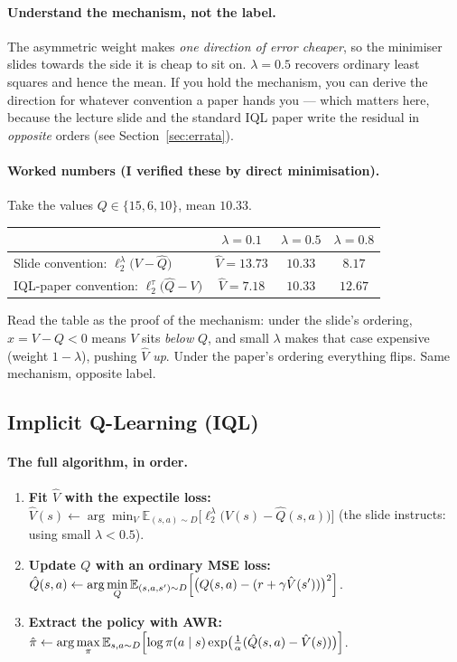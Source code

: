 \documentclass[11pt,a4paper]{article}
\begin{document}
\paragraph{Understand the mechanism, not the label.} The asymmetric weight
makes \emph{one direction of error cheaper}, so the minimiser slides towards
the side it is cheap to sit on. $\lambda=0.5$ recovers ordinary least squares
and hence the mean. If you hold the mechanism, you can derive the direction
for whatever convention a paper hands you --- which matters here, because the
lecture slide and the standard IQL paper write the residual in
\emph{opposite} orders (see Section~\ref{sec:errata}).

\paragraph{Worked numbers (I verified these by direct minimisation).} Take the
values $Q\in\{15,6,10\}$, mean $10.33$.
\begin{center}
\begin{tabular}{@{}lccc@{}}
\toprule
& $\lambda=0.1$ & $\lambda=0.5$ & $\lambda=0.8$ \\
\midrule
Slide convention: $\ell_2^\lambda\bigl(V-\hat Q\bigr)$ & $\hat V=13.73$ & $10.33$ & $8.17$ \\
IQL-paper convention: $\ell_2^{\tau}\bigl(\hat Q-V\bigr)$ & $\hat V=7.18$ & $10.33$ & $12.67$ \\
\bottomrule
\end{tabular}
\end{center}
Read the table as the proof of the mechanism: under the slide's ordering,
$x=V-Q<0$ means $V$ sits \emph{below} $Q$, and small $\lambda$ makes that case
expensive (weight $1-\lambda$), pushing $\hat V$ \emph{up}. Under the paper's
ordering everything flips. Same mechanism, opposite label.

\subsection{Implicit Q-Learning (IQL)}

\paragraph{The full algorithm, in order.}
\begin{enumerate}[label=\arabic*.]
\item \textbf{Fit $\hat V$ with the expectile loss:}
$\displaystyle \hat V(s)\leftarrow\arg\min_V \mathbb E_{(s,a)\sim D}\bigl[\ell_2^{\lambda}\bigl(V(s)-\hat Q(s,a)\bigr)\bigr]$
(the slide instructs: using small $\lambda<0.5$).
\item \textbf{Update $Q$ with an ordinary MSE loss:}
$\displaystyle \hat Q(s,a)\leftarrow\arg\min_Q \mathbb E_{(s,a,s')\sim D}\Bigl[\bigl(Q(s,a)-(r+\gamma\hat V(s'))\bigr)^2\Bigr]$.
\item \textbf{Extract the policy with AWR:}
$\displaystyle \hat\pi\leftarrow\arg\max_\pi \mathbb E_{s,a\sim D}\Bigl[\log\pi(a\mid s)\exp\bigl(\tfrac1\alpha(\hat Q(s,a)-\hat V(s))\bigr)\Bigr]$.
\end{enumerate}
\end{document}
